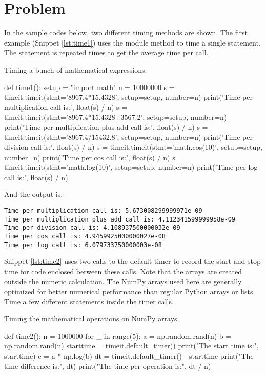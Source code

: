 \section{Problem \thesection}

In the sample codes below, two different timing methods are shown. The first example
(Snippet \ref{lst:time1}) uses the
 module method  to time a single statement.
The statement is repeated  times to get the average time per call.

\begin{algorithm}
    \caption{Timing a bunch of mathematical expressions.}
    \label{lst:time1}
    \begin{pythoncode}
        def time1():
            setup = "import math"
            n = 10000000
            s = timeit.timeit(stmt='8967.4*15.4328', setup=setup, number=n)
            print('Time per multiplication call is:', float(s) / n)
            s = timeit.timeit(stmt='8967.4*15.4328+3567.2', setup=setup, number=n)
            print('Time per multiplication plus add call is:', float(s) / n)
            s = timeit.timeit(stmt='8967.4/15432.8', setup=setup, number=n)
            print('Time per division call is:', float(s) / n)
            s = timeit.timeit(stmt='math.cos(10)', setup=setup, number=n)
            print('Time per cos call is:', float(s) / n)
            s = timeit.timeit(stmt='math.log(10)', setup=setup, number=n)
            print('Time per log call is:', float(s) / n)
    \end{pythoncode}
\end{algorithm}

And the output is:

\begin{verbatim}
Time per multiplication call is: 5.673008299999971e-09
Time per multiplication plus add call is: 4.112341599999958e-09
Time per division call is: 4.108937500000032e-09
Time per cos call is: 4.9459925000000027e-08
Time per log call is: 6.079733750000003e-08
\end{verbatim}

Snippet \ref{lst:time2} uses two calls to the default timer to record the start and stop
time for code enclosed between these calls. Note that the arrays are created outside the
numeric calculation. The NumPy arrays used here are generally optimized for better numerical
performance than regular Python arrays or lists. Time a few different statements inside the
timer calls.

\begin{algorithm}
    \caption{Timing the mathematical operations on NumPy arrays.}
    \label{lst:time2}
    \begin{pythoncode}
        def time2():
            n = 1000000
            for _ in range(5):
                a = np.random.rand(n)
                b = np.random.rand(n)
            starttime = timeit.default_timer()
            print("The start time is:", starttime)
            c = a * np.log(b)
            dt = timeit.default_timer() - starttime
            print("The time difference is:", dt)
            print("The time per operation is:", dt / n)
    \end{pythoncode}
\end{algorithm}

